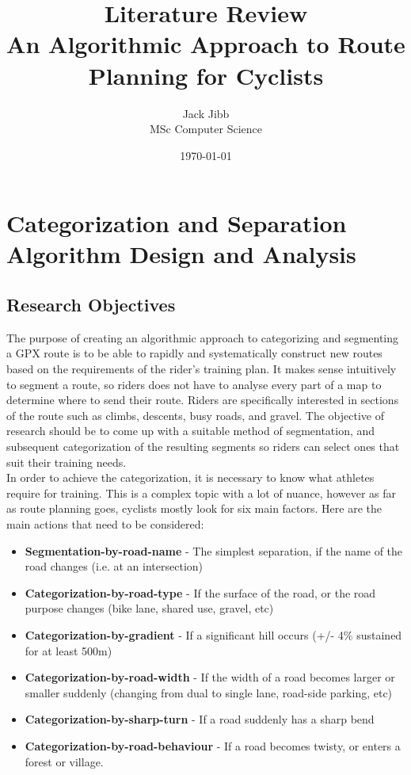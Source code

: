 \documentclass[12pt,a4paper]{report}
\title{Literature Review \\ \large An Algorithmic Approach to Route Planning for Cyclists}
\author{Jack Jibb \\ MSc Computer Science}
\date{\today}
\begin{document}
\maketitle

\tableofcontents
\newpage

\section{Categorization and Separation Algorithm Design and Analysis}

\subsection{Research Objectives}
The purpose of creating an algorithmic approach to categorizing and segmenting a GPX route is to be able to rapidly and systematically construct new routes based on the requirements of the rider's training plan.
It makes sense intuitively to segment a route, so riders does not have to analyse every part of a map to determine where to send their route. Riders are specifically interested in sections of the route such as climbs, descents, busy roads, and gravel.
The objective of research should be to come up with a suitable method of segmentation, and subsequent categorization of the resulting segments so riders can select ones that suit their training needs.
\\
In order to achieve the categorization, it is necessary to know what athletes require for training. This is a complex topic with a lot of nuance, however as far as route planning goes, cyclists mostly look for six main factors.
Here are the main actions that need to be considered:
\begin{itemize}
	\item \textbf{Segmentation-by-road-name} - The simplest separation, if the name of the road changes (i.e. at an intersection)
	\item \textbf{Categorization-by-road-type} - If the surface of the road, or the road purpose changes (bike lane, shared use, gravel, etc)
	\item \textbf{Categorization-by-gradient} - If a significant hill occurs (+/- 4\% sustained for at least 500m)
	\item \textbf{Categorization-by-road-width} - If the width of a road becomes larger or smaller suddenly (changing from dual to single lane, road-side parking, etc)
	\item \textbf{Categorization-by-sharp-turn} - If a road suddenly has a sharp bend
	\item \textbf{Categorization-by-road-behaviour} - If a road becomes twisty, or enters a forest or village.
\end{itemize}
\end{document}
